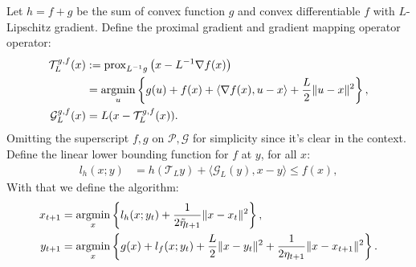\documentclass[12pt]{article}
\begin{document}
            \begin{definition}
            \label{def:ag_prox_grad_ppm}
                Let $h=f + g$ be the sum of convex function $g$ and convex differentiable $f$ with $L$-Lipschitz gradient. 
                Define the proximal gradient and gradient mapping operator operator: 
                $$
                \begin{aligned}
                    \mathcal T_L^{g, f}(x) &:=  
                    \operatorname{prox}_{L^{-1}g}\left(x - L^{-1}\nabla f(x)\right)
                    \\
                    &= 
                    \mathop{\rm argmin}\limits_{u}
                    \left\lbrace
                        g(u) + f(x) + \langle \nabla f(x), u - x\rangle
                        + 
                        \frac{L}{2}\Vert u - x\Vert^2
                    \right\rbrace,
                    \\
                    \mathcal G_L^{g, f}(x) &= 
                    L(x - \mathcal T_L^{g, f}(x)). 
                \end{aligned}
                $$
                Omitting the superscript $f, g$ on $\mathcal P, \mathcal G$ for simplicity since it's clear in the context. 
                Define the linear lower bounding function for $f$ at $y$, for all $x$: 
                $$
                \begin{aligned}
                    l_h(x; y) &= h(\mathcal T_L y) + \langle \mathcal G_L(y), x - y \rangle \le f(x), 
                \end{aligned}
                $$
                With that we define the algorithm:
                $$
                \begin{aligned}
                    x_{t + 1} &= \mathop{\rm argmin}\limits_{x} \left\lbrace
                        l_h(x; y_t) + \frac{1}{2\tilde \eta_{t + 1}} 
                        \Vert x - x_t\Vert^2
                    \right\rbrace,
                    \\
                    y_{t + 1}&= 
                    \mathop{\rm argmin}\limits_{x}
                    \left\lbrace
                        g(x) + l_f(x; y_t) + \frac{L}{2}\Vert x - y_t\Vert^2 + 
                        \frac{1}{2\eta_{t + 1}} \Vert x - x_{t + 1}\Vert^2
                    \right\rbrace.
                \end{aligned}
                $$
            \end{definition}
\end{document}
